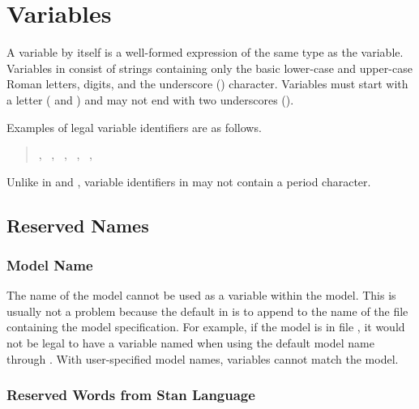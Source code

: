 \section{Variables}

A variable by itself is a well-formed expression of the same type as
the variable.  Variables in \Stan consist of \ASCII strings containing
only the basic lower-case and upper-case Roman letters, digits, and
the underscore (\code{\_}) character.  Variables must start with a
letter ( and ) and may not end with two underscores
(\code{\_\_}).

Examples of legal variable identifiers are as follows.
%
\begin{quote}
, 
\ , 
\ ,
\ , 
\ ,
\ 
\end{quote}
%
Unlike in \R and \BUGS, variable identifiers in \Stan may not contain
a period character.  

\subsection{Reserved Names}

\subsubsection{Model Name}

The name of the model cannot be used as a variable within the model.
This is usually not a problem because the default in 
is to append  to the name of the file containing the
model specification.  For example, if the model is in file
, it would not be legal to have a variable named
 when using the default model name through
.  With user-specified model names, variables cannot
match the model.

\subsubsection{Reserved Words from Stan Language}


